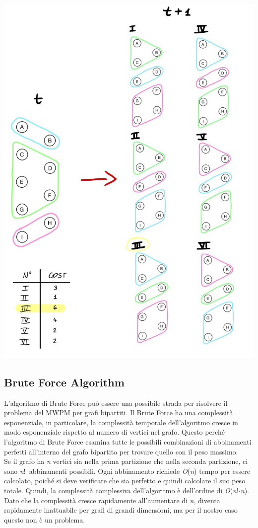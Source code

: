 \includegraphics[width=\textwidth, height=\textheight, keepaspectratio]{graphics/stabilization.jpg}


\subsection{Brute Force Algorithm}
L'algoritmo di Brute Force può essere una possibile strada per risolvere il problema del MWPM per grafi bipartiti.
Il Brute Force ha una complessità esponenziale, in particolare, la complessità temporale dell'algoritmo cresce in modo esponenziale rispetto al numero di vertici nel grafo.
Questo perché l'algoritmo di Brute Force esamina tutte le possibili combinazioni di abbinamenti perfetti all'interno del grafo bipartito per trovare quello con il peso massimo. \\
Se il grafo ha \textit{n} vertici sia nella prima partizione che nella seconda partizione, ci sono \textit{n}!\ abbinamenti possibili.
Ogni abbinamento richiede \textit{O}(\textit{n}) tempo per essere calcolato, poiché si deve verificare che sia perfetto e quindi calcolare il suo peso totale.
Quindi, la complessità complessiva dell'algoritmo è dell'ordine di \textit{O}(\textit{n}!$\cdot$\textit{n}). \\
Dato che la complessità cresce rapidamente all'aumentare di \textit{n}, diventa rapidamente inattuabile per grafi di grandi dimensioni, ma per il nostro caso questo non è un problema.

